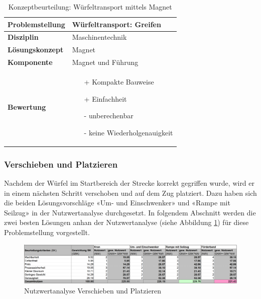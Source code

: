 \documentclass[../../main.tex]{subfiles}
\begin{document}
 \begin{flushleft}
    \begin{table}[h]
    \begin{tabular}{ | l | p{11cm} |}
    \hline
    \textbf{Problemstellung} & Würfeltransport: Greifen \\ \hline
    \textbf{Disziplin} & Maschinentechnik \\ \hline
    \textbf{Lösungskonzept} &  Magnet \\ \hline
    \textbf{Komponente} & Magnet und Führung \\ \hline
    \textbf{Bewertung} &  \begin{itemize}
                            \item[+] Kompakte Bauweise
                            \item[+] Einfachheit
                            \item[-] unberechenbar 
                            \item[-] keine Wiederholgenauigkeit
                          \end{itemize} \\ \hline
    \end{tabular}
    \caption{Konzeptbeurteilung: Würfeltransport mittels Magnet}
    \label{tab:konzept_wurfeltrransport_magnet}
\end{table}
\end{flushleft}
\subsubsection{Verschieben und Platzieren}
Nachdem der Würfel im Startbereich der Strecke korrekt gegriffen wurde, wird er in einem nächsten Schritt verschoben und auf dem Zug platziert. Dazu haben sich die beiden Lösungsvorschläge «Um- und Einschwenker» und «Rampe mit Seilzug» in der Nutzwertanalyse durchgesetzt. In folgendem Abschnitt werden die zwei besten Lösungen anhan der Nutzwertanalyse (siehe Abbildung \ref{fig:verschieben_platzieren}) für diese Problemstellung vorgestellt.

\begin{figure}[H] %
    \centering
    \includegraphics[width=1\textwidth]{Verschieben_platzieren}
    \caption{Nutzwertanalyse Verschieben und Platzieren}
    \label{fig:verschieben_platzieren}
\end{figure}
\end{document}
